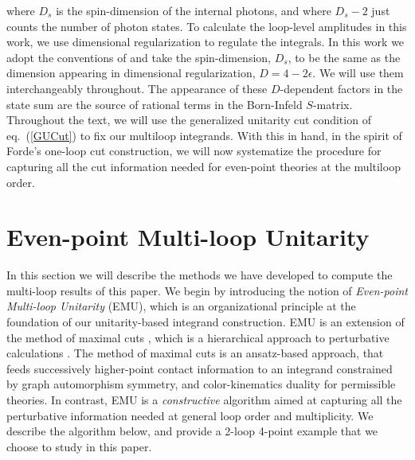 \documentclass[12pt,letter]{article}
\def\eqn#1{eq.~(\ref{#1})}
\begin{document}
 where $D_s$ is the spin-dimension of the internal photons, and where $D_s-2$ just counts the number of photon states. To calculate the loop-level amplitudes in this work, we use dimensional regularization to regulate the integrals. In this work we adopt the conventions of  \cite{collins_1984,Bern:2002zk} and take the spin-dimension, $D_s$, to be
the same as the dimension appearing in dimensional regularization, $D=4-2\epsilon$. We will use them interchangeably throughout. The appearance of these $D$-dependent factors in the state sum are the source of rational terms in the Born-Infeld $S$-matrix. Throughout the text, we will use the generalized unitarity cut condition of \eqn{GUCut} to fix our multiloop integrands. With this in hand, in the spirit of Forde's one-loop cut construction, we will now systematize the procedure for capturing all the cut information needed for even-point theories at the multiloop order. 
\section{Even-point Multi-loop Unitarity}
\label{sec:EMU}
In this section we will describe the methods we have developed to compute the multi-loop results of this paper. We begin by introducing the notion of \textit{Even-point Multi-loop Unitarity} (EMU), which is an organizational principle at the foundation of our unitarity-based integrand construction. EMU is an extension of the method of maximal cuts \cite{}, which is a hierarchical approach to perturbative calculations \cite{}. The method of maximal cuts is an ansatz-based approach, that feeds successively higher-point contact information to an integrand constrained by graph automorphism symmetry, and color-kinematics duality for permissible theories. In contrast, EMU is a \textit{constructive} algorithm aimed at capturing all the perturbative information needed at general loop order and multiplicity. We describe the algorithm below, and provide a 2-loop 4-point example that we choose to study in this paper.
\end{document}

